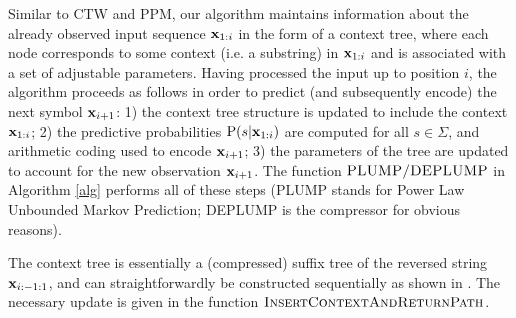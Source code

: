 Similar to CTW and PPM, our algorithm maintains information about the already
observed input sequence $\xbf_{1:i}$ in the form of a context tree, where
each node corresponds to some context (i.e. a substring) in $\xbf_{1:i}$ and
is associated with a set of adjustable parameters. 
Having processed the input up to position $i$, the algorithm proceeds as
follows in order to predict (and subsequently encode) the next symbol $\xbf_{i+1}$:
1) the context tree structure is updated to include the context $\xbf_{1:i}$;
2) the predictive probabilities $\Prob(s|\xbf_{1:i})$ are computed for
all $s \in \Sigma$, and arithmetic coding used to encode $\xbf_{i+1}$; 
3) the parameters of the tree are updated to account for the new observation $\xbf_{i+1}$. 
The function $\PredictEncodeDecode$ in Algorithm \ref{alg} performs all of these
steps (PLUMP stands for Power Law Unbounded Markov Prediction; DEPLUMP is the compressor for obvious reasons).

The context tree is essentially a (compressed) suffix tree of the reversed string $\xbf_{i:-1:1}$, and can straightforwardly be constructed 
sequentially as shown in . The necessary update is given in
the function $\InsertContext$.


